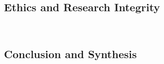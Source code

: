\documentclass[12pt,a4paper]{article}
\newcommand{\lecture}[3][\DefaultOpt]{%
  \def\DefaultOpt{#2}%
  \clearpage\subsection[#1]{#2}\emph{#3}\vspace{.25em}\\
}
\newcommand{\reading}[2][]{\noindent -- {#1}\bibentry{#2}.\vspace{.25em}\\}
\begin{document}
\lecture{Ethics and Research Integrity}{}

\lecture{Conclusion and Synthesis}{}





\end{document}
